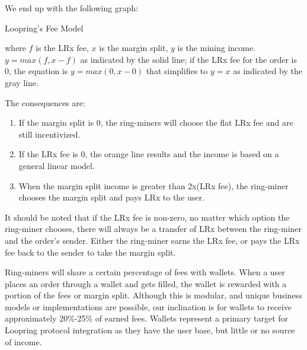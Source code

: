 \documentclass[UTF8,nofonts]{article}
\makeatletter
\newenvironment{figurehere}
 {\def\@captype{figure}}
 {}
\makeatother
\begin{document}
\begin{multicols}{2}
We end up with the following graph:

\begin{center}
\begin{figurehere}
\centering
{}
\caption{Loopring's Fee Model}
\label{fig:feemodel}
\end{figurehere}
\end{center}


where $f$ is the LRx fee, $x$ is the margin split, $y$ is the mining income. $y=max(f, x-f)$ as indicated by the solid line; if the LRx fee for the order is $0$, the equation is $y=max(0, x - 0)$ that simplifies to $y=x$ as indicated by the gray line.


The consequences are:  
\begin{enumerate}
	\item If the margin split is 0, the ring-miners will choose the flat LRx fee and are still incentivized. 
	\item If the LRx fee is 0, the orange line results and the income is based on a general linear model.
	\item When the margin split income is greater than 2x(LRx fee), the ring-miner chooses the margin split and pays LRx to the user.
\end{enumerate}

It should be noted that if the LRx fee is non-zero, no matter which option the ring-miner chooses, there will always be a transfer of LRx between the ring-miner and the order's sender. Either the ring-miner earns the LRx fee, or pays the LRx fee back to the sender to take the margin split.

 Ring-miners will share a certain percentage of fees with wallets. When a user places an order through a wallet and gets filled, the wallet is rewarded with a portion of the fees or margin split. Although this is modular, and unique business models or implementations are possible, our inclination is for wallets to receive approximately 20\%-25\% of earned fees. Wallets represent a primary target for Loopring protocol integration as they have the user base, but little or no source of income.


\end{multicols}
\end{document}
